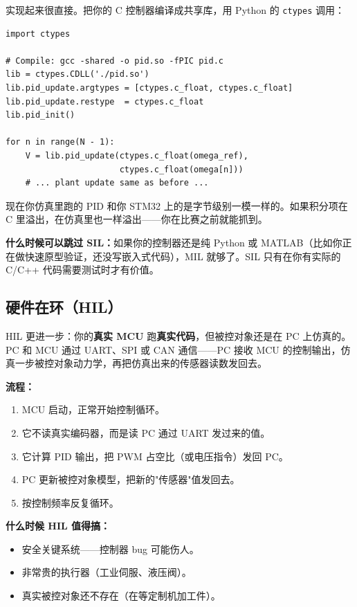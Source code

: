 实现起来很直接。把你的 C 控制器编译成共享库，用 Python 的 \texttt{ctypes} 调用：

\begin{verbatim}
import ctypes

# Compile: gcc -shared -o pid.so -fPIC pid.c
lib = ctypes.CDLL('./pid.so')
lib.pid_update.argtypes = [ctypes.c_float, ctypes.c_float]
lib.pid_update.restype  = ctypes.c_float
lib.pid_init()

for n in range(N - 1):
    V = lib.pid_update(ctypes.c_float(omega_ref),
                       ctypes.c_float(omega[n]))
    # ... plant update same as before ...
\end{verbatim}

现在你仿真里跑的 PID 和你 STM32 上的是字节级别一模一样的。如果积分项在 C 里溢出，在仿真里也一样溢出——你在比赛之前就能抓到。

\textbf{什么时候可以跳过 SIL：}如果你的控制器还是纯 Python 或 MATLAB（比如你正在做快速原型验证，还没写嵌入式代码），MIL 就够了。SIL 只有在你有实际的 C/C++ 代码需要测试时才有价值。

\subsection{硬件在环（HIL）}

HIL 更进一步：你的\textbf{真实 MCU} 跑\textbf{真实代码}，但被控对象还是在 PC 上仿真的。PC 和 MCU 通过 UART、SPI 或 CAN 通信——PC 接收 MCU 的控制输出，仿真一步被控对象动力学，再把仿真出来的传感器读数发回去。

\textbf{流程：}
\begin{enumerate}
    \item MCU 启动，正常开始控制循环。
    \item 它不读真实编码器，而是读 PC 通过 UART 发过来的值。
    \item 它计算 PID 输出，把 PWM 占空比（或电压指令）发回 PC。
    \item PC 更新被控对象模型，把新的"传感器"值发回去。
    \item 按控制频率反复循环。
\end{enumerate}

\textbf{什么时候 HIL 值得搞：}
\begin{itemize}
    \item 安全关键系统——控制器 bug 可能伤人。
    \item 非常贵的执行器（工业伺服、液压阀）。
    \item 真实被控对象还不存在（在等定制机加工件）。
\end{itemize}

